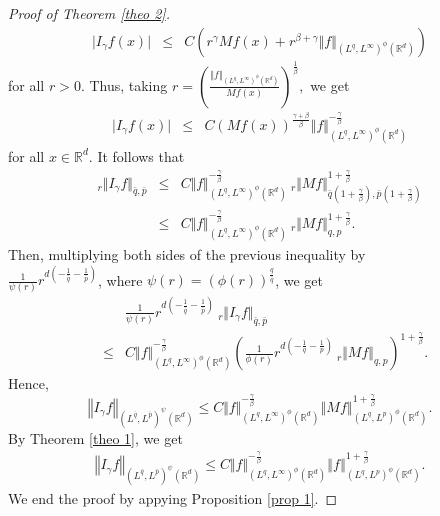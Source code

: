 \documentclass[10pt,a4paper]{amsart}
\numberwithin{equation}{section}
\numberwithin{equation}{section}
\begin{document}
\begin{proof}[Proof of Theorem \ref{theo 2}]
\begin{eqnarray*}
\vert I_{\gamma} f(x) \vert &\leq& C\left(r^{\gamma} M f(x)+r^{\beta +\gamma}\Vert f \Vert_{(L^{q},L^{\infty})^{\phi}(\mathbb{R}^{d})}\right)
\end{eqnarray*}
for all $ r > 0 $. Thus, taking $r = \left( \frac{\Vert f \Vert_{(L^{q},L^{\infty})^{\phi}(\mathbb{R}^{d})}}{Mf(x)}         \right)^{\frac{1}{\beta}},$ we get 
\begin{eqnarray*}
\label{rel 33}
\vert I_{\gamma} f(x) \vert &\leq& C (Mf(x))^{\frac{\gamma + \beta }{\beta}} \Vert f \Vert^{-\frac{\gamma}{\beta}}_{(L^{q},L^{\infty})^{\phi}(\mathbb{R}^{d})}
\end{eqnarray*}
for all $ x \in \mathbb{R}^{d}$. It follows that 
\begin{eqnarray*}
_{r}\Vert I_{\gamma} f \Vert_{\bar{q},\bar{p}} &\leq& C\Vert f \Vert^{-\frac{\gamma}{\beta}}_{(L^{q},L^{\infty})^{\phi}(\mathbb{R}^{d})}\:_{r}\Vert M f \Vert^{1+ \frac{\gamma}{\beta}}_{\bar{q}(1+ \frac{\gamma}{\beta}),\bar{p}(1+ \frac{\gamma}{\beta})}\\
&\leq& C\Vert f \Vert^{-\frac{\gamma}{\beta}}_{(L^{q},L^{\infty})^{\phi}(\mathbb{R}^{d})}\:_{r}\Vert M f \Vert^{1+ \frac{\gamma}{\beta}}_{q,p}.
\end{eqnarray*}
Then, multiplying both sides of the previous inequality by\\ $ \frac{1}{\psi(r)} r^{d(-\frac{1}{\bar{q}}-\frac{1}{\bar{p}})} $, where  $\psi(r)= (\phi(r))^{\frac{q}{\bar{q}}}$, we get 
\begin{eqnarray*}
&&\frac{1}{\psi(r)} r^{d(-\frac{1}{\bar{q}}-\frac{1}{\bar{p}})} \:_{r}\Vert I_{\gamma} f \Vert_{\bar{q},\bar{p}} \\ &\leq& C\Vert f \Vert^{-\frac{\gamma}{\beta}}_{(L^{q},L^{\infty})^{\phi}(\mathbb{R}^{d})}    \left(  \frac{1}{\phi(r)} r^{d(-\frac{1}{q}-\frac{1}{p})}\:_{r}\Vert M f \Vert_{q,p}  \right)^{1+ \frac{\gamma}{\beta}}.
\end{eqnarray*}
Hence,  $$\left\Vert I_{\gamma}f \right\Vert_{(L^{\bar{q}},L^{\bar{p}})^{\psi}(\mathbb{R}^{d})} \leq C\Vert f \Vert^{-\frac{\gamma}{\beta}}_{(L^{q},L^{\infty})^{\phi}(\mathbb{R}^{d})} \left\Vert Mf  \right\Vert^{1+ \frac{\gamma}{\beta}}_{(L^{q},L^{p})^{\phi}(\mathbb{R}^{d})}.$$
By Theorem \ref{theo 1}, we get 
\begin{eqnarray*}
\label{rel 44}
\left\Vert I_{\gamma}f \right\Vert_{(L^{\bar{q}},L^{\bar{p}})^{\psi}(\mathbb{R}^{d})} \leq C\Vert f \Vert^{-\frac{\gamma}{\beta}}_{(L^{q},L^{\infty})^{\phi}(\mathbb{R}^{d})} \left\Vert f  \right\Vert^{1+ \frac{\gamma}{\beta}}_{(L^{q},L^{p})^{\phi}(\mathbb{R}^{d})}.
\end{eqnarray*}
We end the proof by appying Proposition \ref{prop 1}.
\end{proof}
\end{document}
